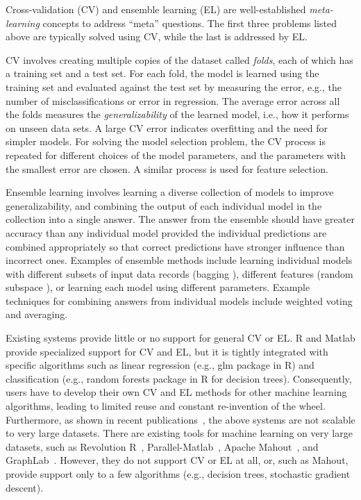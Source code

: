 \documentclass{vldb}
\newcommand{\eat}[1]{} %
\begin{document}
\eat{
    TODO: we may want to revisit list to address scalability aspect.
}

Cross-validation (CV) and ensemble learning (EL) are well-established \emph{meta-learning} concepts
to address ``meta'' questions.  The first three problems listed above are typically solved using CV,
while the last is addressed by EL.


CV involves creating multiple copies of the dataset called {\em folds}, each of which has a training
set and a test set.  For each fold, the model is learned using the training set and evaluated
against the test set by measuring the error, e.g., the number of misclassifications or error in
regression.  The average error across all the folds measures the {\em generalizability} of the
learned model, i.e., how it performs on unseen data sets.  A large CV error indicates overfitting
and the need for simpler models.  For solving the model selection problem, the CV process is
repeated for different choices of the model parameters, and the parameters with the smallest error
are chosen.  A similar process is used for feature selection.

Ensemble learning involves learning a diverse collection of models to improve generalizability, and
combining the output of each individual model in the collection into a single answer.  The answer
from the ensemble should have greater accuracy than any individual model provided the individual
predictions are combined appropriately so that correct predictions have stronger influence than
incorrect ones.  Examples of ensemble methods include learning individual models with different
subsets of input data records (bagging \cite{springerlink:10.1007/BF00058655}), different features
(random subspace \cite{rsm}), or learning each model using different parameters.  Example techniques
for combining answers from individual models include weighted voting and averaging.

Existing systems provide little or no support for general CV or EL. R and Matlab provide specialized
support for CV and EL, but it is tightly integrated with specific algorithms such as linear
regression (e.g., glm package in R) and classification (e.g., random forests package in R for
decision trees).  Consequently, users have to develop their own CV and EL methods for other machine
learning algorithms, leading to limited reuse and constant re-invention of the wheel. Furthermore,
as shown in recent publications~\cite{systemml}, the above systems are not scalable to very large
datasets. There are existing tools for machine learning on very large datasets, such as Revolution
R~\cite{revolutionr}, Parallel-Matlab~\cite{toolbox}, Apache Mahout~\cite{mahout}, and
GraphLab~\cite{DBLP:conf/nips/ChuKLYBNO06,Low+al:uai10graphlab}. However, they do not support CV or
EL at all, or, such as Mahout, provide support only to a few algorithms (e.g., decision trees,
stochastic gradient descent).
\end{document}
